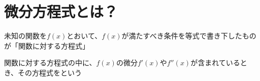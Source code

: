 \documentclass[../book_jiriki_calc]{subfiles}
\begin{document}
\section*{微分方程式とは？}

未知の関数を$f(x)$とおいて、$f(x)$が満たすべき条件を等式で書き下したものが「関数に対する方程式」

関数に対する方程式の中に、$f(x)$の微分$f'(x)$や$f''(x)$が含まれているとき、その方程式をという
\end{document}
